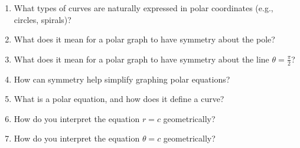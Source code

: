 \begin{enumerate}
\item What types of curves are naturally expressed in polar coordinates (e.g., circles, spirals)?

\item What does it mean for a polar graph to have symmetry about the pole?

\item What does it mean for a polar graph to have symmetry about the line $\theta = \frac{\pi}{2}$?

\item How can symmetry help simplify graphing polar equations?

\item What is a polar equation, and how does it define a curve?

\item How do you interpret the equation $r = c$ geometrically?

\item How do you interpret the equation $\theta = c$ geometrically?

\end{enumerate}
